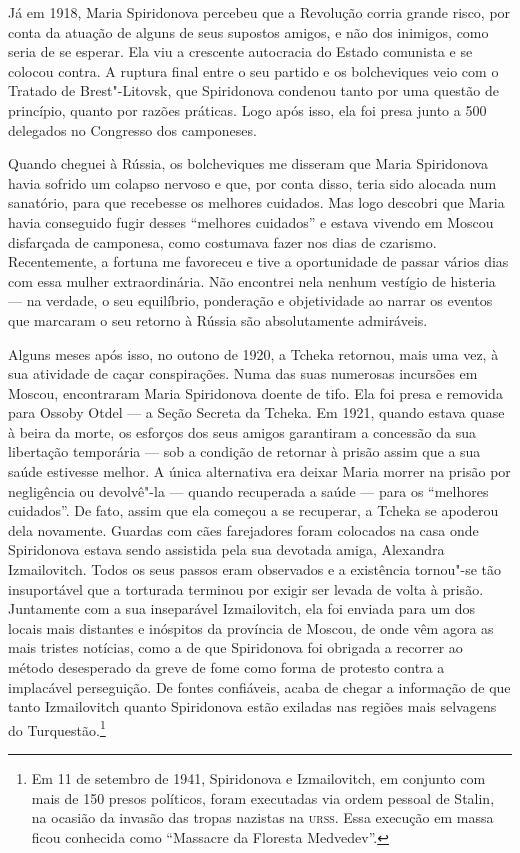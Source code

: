Já em 1918, Maria Spiridonova percebeu que a Revolução corria grande
risco, por conta da atuação de alguns de seus supostos amigos, e não dos
inimigos, como seria de se esperar. Ela viu a crescente autocracia do Estado comunista e se
colocou contra. A ruptura final entre o seu partido e os
bolcheviques veio com o Tratado de Brest"-Litovsk, que Spiridonova condenou
tanto por uma questão de princípio, quanto por razões práticas. Logo após
isso, ela foi presa junto a 500 delegados no Congresso dos camponeses.

Quando cheguei à Rússia, os bolcheviques me disseram que Maria
Spiridonova havia sofrido um colapso nervoso e que, por conta disso,
teria sido alocada num sanatório, para que recebesse os melhores
cuidados. Mas logo descobri que Maria havia conseguido fugir desses ``melhores
cuidados'' e estava vivendo em Moscou disfarçada de camponesa, como
costumava fazer nos dias de czarismo. Recentemente, a fortuna me
favoreceu e tive a oportunidade de passar vários dias com essa mulher
extraordinária. Não encontrei nela nenhum vestígio de histeria --- na
verdade, o seu equilíbrio, ponderação e objetividade ao narrar os
eventos que marcaram o seu retorno à Rússia são absolutamente
admiráveis.

Alguns meses após isso, no outono de 1920, a Tcheka retornou, mais uma vez,
à sua atividade de caçar conspirações. Numa das suas numerosas incursões
em Moscou, encontraram Maria Spiridonova doente de tifo. Ela foi presa
e removida para Ossoby Otdel --- a Seção Secreta da Tcheka. Em 1921,
quando estava quase à beira da morte, os esforços dos seus amigos
garantiram a concessão da sua libertação temporária --- sob a condição de
retornar à prisão assim que a sua saúde estivesse melhor. A única
alternativa era deixar Maria morrer na prisão por negligência ou
devolvê"-la --- quando recuperada a saúde --- para os ``melhores cuidados''.
De fato, assim que ela começou a se recuperar, a Tcheka se apoderou dela
novamente. Guardas com cães farejadores foram colocados na casa onde
Spiridonova estava sendo assistida pela sua devotada amiga, Alexandra
Izmailovitch. Todos os seus passos eram observados e a existência
tornou"-se tão insuportável que a torturada terminou por exigir ser
levada de volta à prisão. Juntamente com a sua inseparável Izmailovitch,
ela foi enviada para um dos locais mais distantes e inóspitos da
província de Moscou, de onde vêm agora as mais tristes notícias, como a
de que Spiridonova foi obrigada a recorrer ao método desesperado da
greve de fome como forma de protesto contra a implacável perseguição. De fontes
confiáveis, ​​acaba de chegar a informação de que tanto Izmailovitch
quanto Spiridonova estão exiladas nas regiões mais selvagens do
Turquestão.\footnote{Em 11 de setembro de 1941, Spiridonova e
  Izmailovitch, em conjunto com mais de 150 presos políticos, foram
  executadas via ordem pessoal de Stalin, na ocasião da invasão das
  tropas nazistas na \textsc{urss}. Essa execução em massa ficou conhecida como
  ``Massacre da Floresta Medvedev''.}

